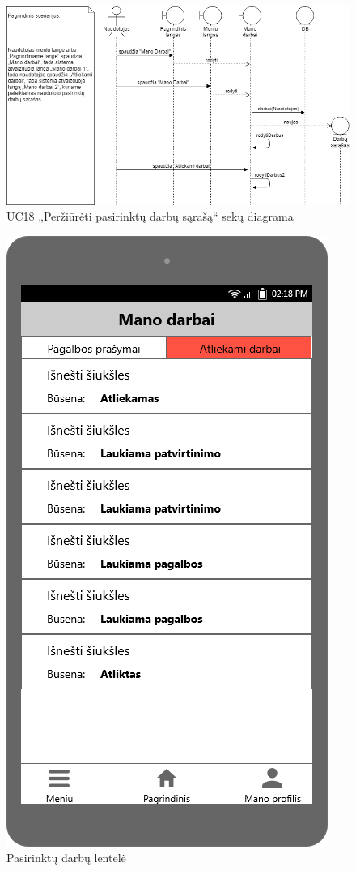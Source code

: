\documentclass{VUMIFPSbakalaurinis}
\begin{document}
\begin{figure}[H]
	\centering
	\includegraphics[scale=0.6]{img/Sequence/SD18}
	\caption{UC18 „Peržiūrėti pasirinktų darbų sąrašą“ sekų diagrama}
	\label{img:uc18seq}
\end{figure}

\begin{figure}[H]
	\centering
	\includegraphics[scale=0.4]{img/ScreenShots/05-Mano-darbai1}
	\caption{Pasirinktų darbų lentelė}
	\label{img:requested jobs table}
\end{figure}
\end{document}
